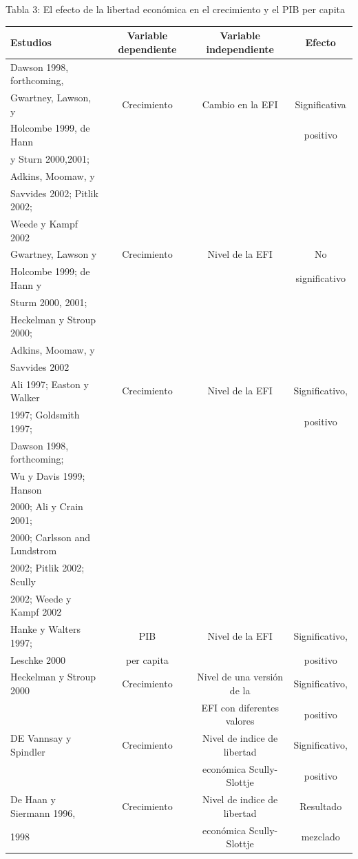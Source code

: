     \begin{center}
	Tabla 3: El efecto de la libertad económica en el crecimiento y el PIB per capita
	\begin{tabular}{lccc}
	    \hline
	    Estudios & Variable dependiente & Variable independiente & Efecto \\
	    \hline
	    Dawson 1998, forthcoming,&&&\\
		     Gwartney, Lawson, y&Crecimiento&Cambio en la EFI&Significativa\\
					Holcombe 1999, de Hann&&&positivo\\
					y Sturn 2000,2001;&&&\\
					Adkins, Moomaw, y&&&\\
					Savvides 2002; Pitlik 2002;&&&\\
								   Weede y Kampf 2002&&&\\
												  \hline
										     Gwartney, Lawson y &Crecimiento&Nivel de la EFI&No\\
										     Holcombe 1999; de Hann y&&&significativo\\
										     Sturm 2000, 2001;&&&\\
										     Heckelman y Stroup 2000;&&&\\
										     Adkins, Moomaw, y&&&\\
										     Savvides 2002&&&\\
												  \hline
												  Ali 1997; Easton y Walker&Crecimiento&Nivel de la EFI&Significativo, \\
												  1997; Goldsmith 1997;&&&positivo\\
												  Dawson 1998, forthcoming;&&&\\
												  Wu y Davis 1999; Hanson&&&\\
												  2000; Ali y Crain 2001;&&&\\
												  2000; Carlsson and Lundstrom&&&\\
												  2002; Pitlik 2002; Scully&&&\\
												  2002; Weede y Kampf 2002&&&\\
												  \hline
							    Hanke y Walters 1997;&PIB&Nivel de la EFI&Significativo,\\
							    Leschke 2000&per capita&&positivo\\
							    \hline
							    Heckelman y Stroup 2000&Crecimiento&Nivel de una versión de la&Significativo,\\
							    &&EFI con diferentes valores&positivo\\
							    \hline
							    DE Vannsay y Spindler&Crecimiento&Nivel de indice de libertad&Significativo,\\
							    &&económica Scully-Slottje&positivo\\
							    \hline
							    De Haan y Siermann 1996,&Crecimiento&Nivel de indice de libertad&Resultado\\
							    1998&&económica Scully-Slottje&mezclado\\
							    \hline
	\end{tabular}\\
    \end{center}

